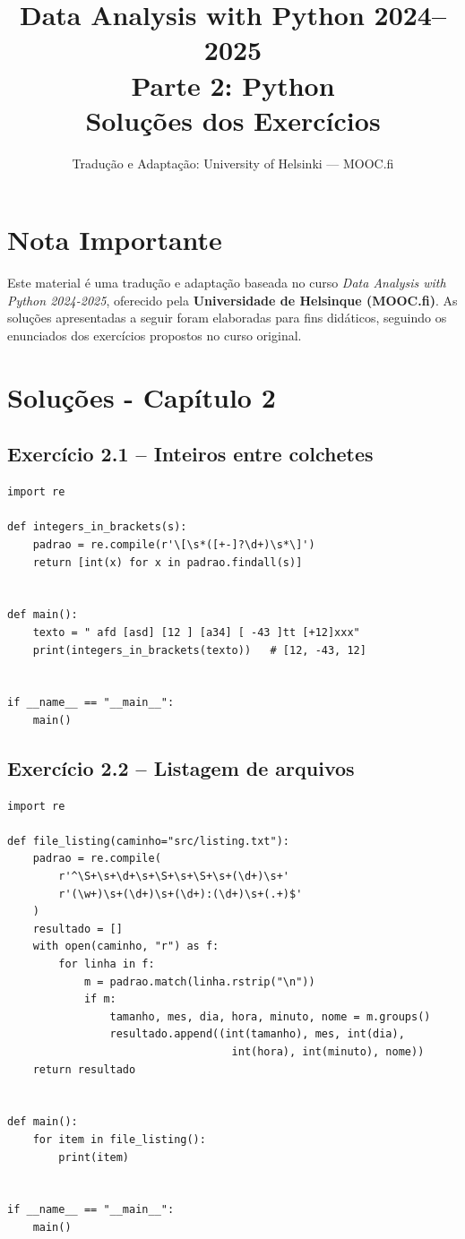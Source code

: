 \documentclass[11pt,a4paper]{article}
\title{\textbf{Data Analysis with Python 2024--2025}\\Parte 2: Python\\\large Soluções dos Exercícios}
\author{Tradução e Adaptação: University of Helsinki --- MOOC.fi}
\date{}
\begin{document}
\maketitle

\section*{Nota Importante}
Este material é uma tradução e adaptação baseada no curso \textit{Data Analysis with Python 2024-2025}, oferecido pela \textbf{Universidade de Helsinque (MOOC.fi)}. As soluções apresentadas a seguir foram elaboradas para fins didáticos, seguindo os enunciados dos exercícios propostos no curso original.

\tableofcontents
\newpage

\section{Soluções - Capítulo 2}

\subsection*{Exercício 2.1 -- Inteiros entre colchetes}

\begin{solucao}
\begin{lstlisting}
import re

def integers_in_brackets(s):
    padrao = re.compile(r'\[\s*([+-]?\d+)\s*\]')
    return [int(x) for x in padrao.findall(s)]


def main():
    texto = " afd [asd] [12 ] [a34] [ -43 ]tt [+12]xxx"
    print(integers_in_brackets(texto))   # [12, -43, 12]


if __name__ == "__main__":
    main()
\end{lstlisting}
\end{solucao}

\subsection*{Exercício 2.2 -- Listagem de arquivos}


\begin{solucao}
\begin{lstlisting}
import re

def file_listing(caminho="src/listing.txt"):
    padrao = re.compile(
        r'^\S+\s+\d+\s+\S+\s+\S+\s+(\d+)\s+'
        r'(\w+)\s+(\d+)\s+(\d+):(\d+)\s+(.+)$'
    )
    resultado = []
    with open(caminho, "r") as f:
        for linha in f:
            m = padrao.match(linha.rstrip("\n"))
            if m:
                tamanho, mes, dia, hora, minuto, nome = m.groups()
                resultado.append((int(tamanho), mes, int(dia),
                                   int(hora), int(minuto), nome))
    return resultado


def main():
    for item in file_listing():
        print(item)


if __name__ == "__main__":
    main()
\end{lstlisting}
\end{solucao}
\end{document}
